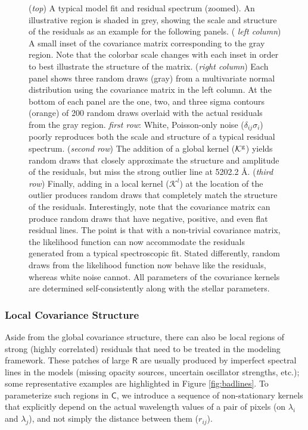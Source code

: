 \documentclass[iop,floatfix]{emulateapj}
\newcommand{\vR}{\mathsf{R}}
\newcommand{\vC}{\mathsf{C}}
\begin{document}
\begin{figure}[!htb]
\begin{center}
\caption{ ({\it top}) A typical model fit and residual spectrum (zoomed). An illustrative region is shaded in grey, showing the scale and structure of the residuals as an example for the following panels. ({ \it left column}) A small inset of the covariance matrix corresponding to the gray region. Note that the colorbar scale changes with each inset in order to best illustrate the structure of the matrix. ({\it right column}) Each panel shows three random draws (gray) from a multivariate normal distribution using the covariance matrix in the left column. At the bottom of each panel are the one, two, and three sigma contours (orange) of 200 random draws overlaid with the actual residuals from the gray region. {\it first row}: White, Poisson-only noise ($\delta_{ij}\sigma_i$) poorly reproduces both the scale and structure of a typical residual spectrum. ({\it second row}) The addition of a global kernel ($\mathcal{K}^{\rm g}$) yields random draws that closely approximate the structure and amplitude of the residuals, but miss the strong outlier line at 5202.2 \AA. ({\it third row}) Finally, adding in a local kernel ($\mathcal{K}^l$) at the location of the outlier produces random draws that completely match the structure of the residuals. Interestingly, note that the covariance matrix can produce random draws that have negative, positive, and even flat residual lines. The point is that with a non-trivial covariance matrix, the likelihood function can now accommodate the residuals generated from a typical spectroscopic fit. Stated differently, random draws from the likelihood function now behave like the residuals, whereas white noise cannot. All parameters of the covariance kernels are determined self-consistently along with the stellar parameters. }
\label{fig:matrix}
\end{center}
\end{figure}


\subsubsection{Local Covariance Structure} \label{subsec:local_covariance}

Aside from the global covariance structure, there can also be local regions of strong (highly 
correlated) residuals that need to be treated in the modeling framework.  These patches of large 
$\vR$ are usually produced by imperfect spectral lines in the models (missing opacity sources, 
uncertain oscillator strengths, etc.); some representative examples are highlighted in Figure 
\ref{fig:badlines}.  To parameterize such regions in $\vC$, we introduce a sequence of 
non-stationary kernels that explicitly depend on the actual wavelength values of a pair of pixels 
(on $\lambda_i$ and $\lambda_j$), and not simply the distance between them ($r_{ij}$).  
\end{document}
